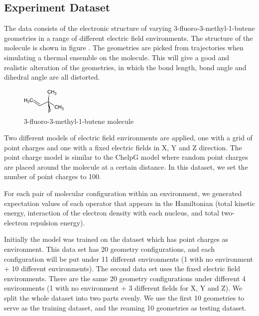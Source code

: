 \documentclass[twoside]{article}
\begin{document}
\subsection{Experiment Dataset}

The data consists of the electronic structure of varying 3-fluoro-3-methyl-1-butene geometries in a range of different electric field environments. The structure of the molecule is shown in figure \cite{fig:molecule}. The geometries are picked from trajectories when simulating a thermal ensemble on the molecule. This will give a good and realistic alteration of the geometries, in which the bond length, bond angle and dihedral angle are all distorted. 

\begin{figure}[h!]

  \caption{3-fluoro-3-methyl-1-butene molecule}
  \label{fig:molecule}
    \centerline{\includegraphics[width=80px]{3-fluoro-3-methyl-1-butene.png}}
\end{figure}


Two different models of electric field environments are applied, one with a grid of point charges and one with a fixed electric fields in X, Y and Z direction. The point charge model is similar to the ChelpG model\cite{ChelpG} where random point charges are placed around the molecule at a certain distance. In this dataset, we set the number of point charges to 100.
 





For each pair of molecular configuration within an environment, we generated expectation values of each operator that appears in the Hamiltonian (total kinetic energy, interaction of the electron density with each nucleus, and total two-electron repulsion energy).

Initially the model was trained on the dataset which has point charges as environment. This data set has 20 geometry configurations, and each configuration will be put under 11 different environments (1 with no environment + 10 different environments). The second data set uses the fixed electric field environments. There are the same 20 geometry configurations under different 4 environments (1 with no environment + 3 different fields for X, Y and Z).  We split the whole dataset into two parts evenly. We use the first 10 geometries to serve as the training dataset, and the reaming 10 geometries as testing dataset.
\end{document}
